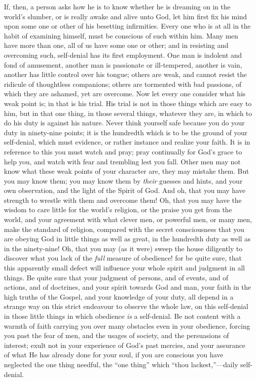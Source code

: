 If, then, a person asks how he is to know whether he
is dreaming on in the world's slumber, or is really awake
and alive unto God, let him first fix his mind upon some
one or other of his besetting infirmities. Every one who
is at all in the habit of examining himself, must be
conscious of such within him. Many men have more than
one, all of us have some one or other; and in resisting
and overcoming such, self-denial has its first
employment. One man is indolent and fond of amusement, another man is passionate or ill-tempered, another is
vain, another has little control over his tongue; others
are weak, and cannot resist the ridicule of thoughtless
companions; others are tormented with bad passions, of
which they are ashamed, yet are overcome. Now let every
one consider what his weak point is; in that is his
trial. His trial is not in those things which are easy to
him, but in that one thing, in those several things,
whatever they are, in which to do his duty is against his
nature. Never think yourself safe because you do your
duty in ninety-nine points; it is the hundredth which is
to be the ground of your self-denial, which must
evidence, or rather instance and realize your faith. It
is in reference to this you must watch and pray; pray
continually for God's grace to help you, and watch with
fear and trembling lest you fall. Other men may not know
what these weak points of your character are, they may
mistake them. But you may know them; you may know them by
\emph{their} guesses and hints, and your own
observation, and the light of the Spirit of God. And oh,
that you may have strength to wrestle with them and
overcome them! Oh, that you may have the wisdom to care
little for the world's religion, or the praise you get
from the world, and your agreement with what clever men,
or powerful men, or many men, make the standard of
religion, compared with the secret consciousness that you
are obeying God in little things as well as great, in the
hundredth duty as well as in the ninety-nine! Oh, that
you may (as it were) sweep the house diligently to
discover what you lack of the \emph{full} measure of
obedience! for be quite sure, that this apparently small
defect will influence your whole spirit and judgment in
all things. Be quite sure that your judgment of persons,
and of events, and of actions, and of doctrines, and your
spirit towards God and man, your faith in the high truths
of the Gospel, and your knowledge of your duty, all
depend in a strange way on this strict endeavour to
observe the whole law, on this self-denial in those
little things in which obedience \emph{is} a
self-denial. Be not content with a warmth of faith
carrying you over many obstacles even in your obedience,
forcing you past the fear of men, and the usages of
society, and the persuasions of interest; exult not in
your experience of God's past mercies, and your assurance
of what He has already done for your soul, if you are
conscious you have neglected the one thing needful, the
``one thing'' which ``thou
lackest,''—daily self-denial.

